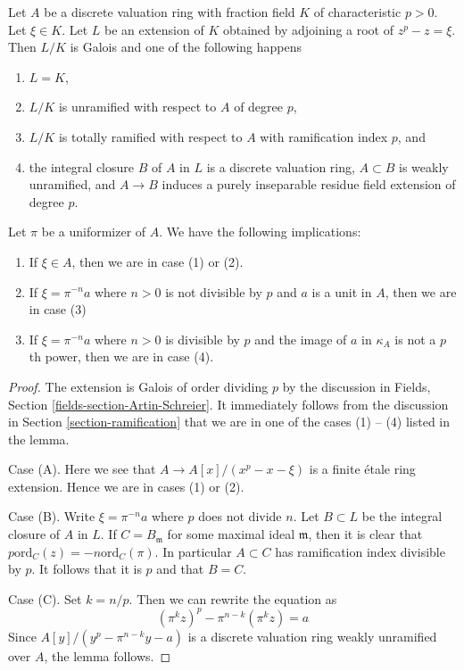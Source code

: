 \begin{lemma}
\label{lemma-pre-characteristic-p-case}
Let $A$ be a discrete valuation ring with fraction field $K$ of characteristic
$p > 0$. Let $\xi \in K$. Let $L$ be an extension of $K$ obtained by
adjoining a root of $z^p - z = \xi$. Then $L/K$ is Galois and one of the
following happens
\begin{enumerate}
\item $L = K$,
\item $L/K$ is unramified with respect to $A$ of degree $p$,
\item $L/K$ is totally ramified with respect to $A$
with ramification index $p$, and
\item the integral closure $B$ of $A$ in $L$ is a discrete valuation ring,
$A \subset B$ is weakly unramified, and $A \to B$ induces a purely inseparable
residue field extension of degree $p$.
\end{enumerate}
Let $\pi$ be a uniformizer of $A$. We have the following implications:
\begin{enumerate}
\item[(A)] If $\xi \in A$, then we are in case (1) or (2).
\item[(B)] If $\xi = \pi^{-n}a$ where $n > 0$ is not divisible by
$p$ and $a$ is a unit in $A$, then we are in case (3)
\item[(C)] If $\xi = \pi^{-n} a$ where $n > 0$ is divisible by $p$ and
the image of $a$ in $\kappa_A$ is not a $p$th power, then we are in case (4).
\end{enumerate}
\end{lemma}

\begin{proof}
The extension is Galois of order dividing $p$ by the discussion in
Fields, Section \ref{fields-section-Artin-Schreier}.
It immediately follows from the discussion in
Section \ref{section-ramification} that we are in one of the cases (1) -- (4)
listed in the lemma.

\medskip\noindent
Case (A). Here we see that $A \to A[x]/(x^p - x - \xi)$ is a finite
\'etale ring extension. Hence we are in cases (1) or (2).

\medskip\noindent
Case (B). Write $\xi = \pi^{-n}a$ where $p$ does not divide $n$.
Let $B \subset L$ be the integral closure of $A$ in $L$.
If $C = B_\mathfrak m$ for some maximal ideal $\mathfrak m$,
then it is clear that $p \text{ord}_C(z) = -n \text{ord}_C(\pi)$.
In particular $A \subset C$ has ramification index divisible by $p$.
It follows that it is $p$ and that $B = C$.

\medskip\noindent
Case (C). Set $k = n/p$. Then we can rewrite the equation as
$$
(\pi^kz)^p - \pi^{n - k} (\pi^kz) = a
$$
Since $A[y]/(y^p - \pi^{n - k}y - a)$ is a discrete valuation ring
weakly unramified over $A$, the lemma follows.
\end{proof}
